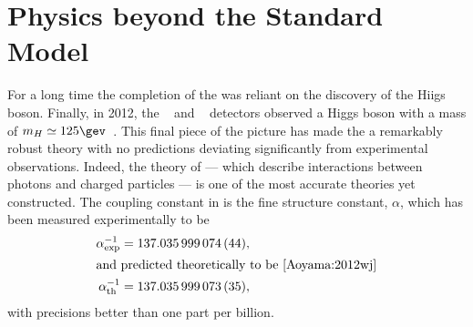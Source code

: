 \section{Physics beyond the Standard Model}
\label{sec:bsm}

For a long time the completion of the \sm was reliant on the discovery of the Hiigs boson.
Finally, in 2012, the \cms~\cite{Chatrchyan:2008aa} and \atlas~\cite{Aad:2008zzm} detectors
observed a Higgs boson with a mass of $m_H\simeq125\gev$~\cite{Chatrchyan:2012ufa,Aad:2012tfa}.
This final piece of the picture has made the \sm a remarkably robust theory with no predictions
deviating significantly from experimental observations.
Indeed, the theory of \QED --- which describe interactions between
photons and charged particles --- is one of the most accurate theories yet constructed.
The coupling constant in \QED is the fine structure constant, $\alpha$, which has been measured
experimentally to be~\cite{PDG2012}
\begin{align}
  \alpha^{-1}_\mathrm{exp} &= 137.035\,999\,074\,(44), \nonumber\\
  \intertext{and predicted theoretically to be~\cite{Aoyama:2012wj}}
  \alpha^{-1}_\mathrm{th} &= 137.035\,999\,073\,(35), \nonumber
\end{align}
with precisions better than one part per billion.



